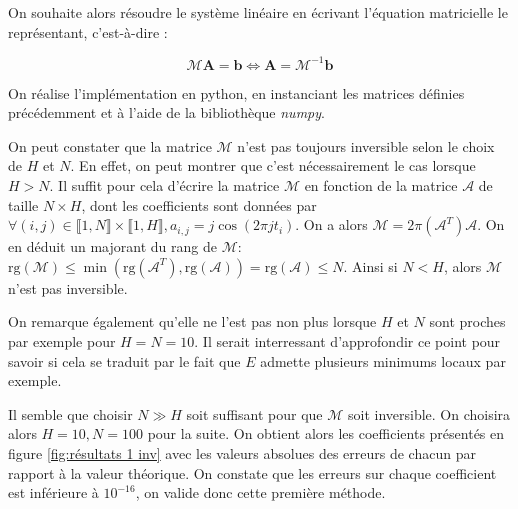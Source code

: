\documentclass[12pt]{report}
\begin{document}
On souhaite alors résoudre le système linéaire en écrivant l'équation matricielle le représentant, c'est-à-dire :

\begin{equation}
    \mathcal{M} \bm{A} = \bm{b} \Leftrightarrow \bm{A} = \mathcal{M}^{-1}\bm{b}
\label{eq:équation matricielle}
\end{equation}

On réalise l'implémentation en python, en instanciant les matrices définies précédemment et à l'aide de la bibliothèque \emph{numpy}. 

On peut constater que la matrice $\mathcal{M}$ n'est pas toujours inversible selon le choix de $H$ et $N$. 
En effet, on peut montrer que c'est nécessairement le cas lorsque $H>N$. Il suffit pour cela d'écrire la matrice $\mathcal{M}$ en fonction de la matrice $\mathcal{A}$ de taille $N \times H$, dont les coefficients sont données par $ \forall (i,j) \in \llbracket 1, N\rrbracket \times \llbracket 1, H\rrbracket, a_{i,j} = j \cos(2 \pi j t_i)$.
On a alors $\mathcal{M} = 2\pi(\mathcal{A}^T)\mathcal{A}$. On en déduit un majorant du rang de $\mathcal{M}$: $\mathrm{rg}(\mathcal{M}) \leq \min(\mathrm{rg}(\mathcal{A}^T), \mathrm{rg}(\mathcal{A})) = \mathrm{rg}(\mathcal{A}) \leq N $. Ainsi si $N<H$, alors $\mathcal{M}$ n'est pas inversible.

On remarque également qu'elle ne l'est pas non plus lorsque $H$ et $N$ sont proches par exemple pour $H=N=10$. 
Il serait interressant d'approfondir ce point pour savoir si cela se traduit par le fait que $E$ admette plusieurs minimums locaux par exemple.

Il semble que choisir $N\gg H$ soit suffisant pour que $\mathcal{M}$ soit inversible. 
On choisira alors $H=10, N=100$ pour la suite.
On obtient alors les coefficients présentés en figure \ref{fig:résultats 1 inv} avec les valeurs absolues des erreurs de chacun par rapport à la valeur théorique. 
On constate que les erreurs sur chaque coefficient est inférieure à $10^{-16}$, on valide donc cette première méthode.
\end{document}
